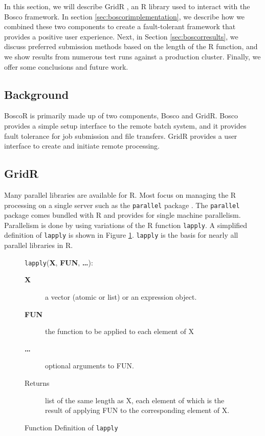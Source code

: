 In this section, we will describe GridR \cite{wegener2007gridr}, an R library used to interact with the Bosco framework.  In section \ref{sec:boscorimplementation}, we describe how we combined these two components to create a fault-tolerant framework that provides a positive user experience.  Next, in Section \ref{sec:boscorresults}, we discuss preferred submission methods based on the length of the R function, and we show results from numerous test runs against a production cluster.  Finally, we offer some conclusions and future work.

\subsection{Background}
BoscoR is primarily made up of two components, Bosco and GridR.  Bosco provides a simple setup interface to the remote batch system, and it provides fault tolerance for job submission and file transfers.  GridR provides a user interface to create and initiate remote processing.


\subsection{GridR}
Many parallel libraries are available for R.  Most focus on managing the R processing on a single server such as the \texttt{parallel} package \cite{rparallelpackage}.  The \texttt{parallel} package comes bundled with R and provides for single machine parallelism.  Parallelism is done by using variations of the R function \texttt{lapply}.  A simplified definition of \texttt{lapply} is shown in Figure \ref{lst:lapply}.  \texttt{lapply} is the basis for nearly all parallel libraries in R.  

\begin{figure}[h!t]
\begin{framed}
\texttt{lapply}(\textbf{X}, \textbf{FUN}, \textbf{\ldots}):
\begin{description}
\item[\textbf{X}] a vector (atomic or list) or an expression object.
\item[\textbf{FUN}] the function to be applied to each element of X
\item[\textbf{\ldots}] optional arguments to FUN.
\item[Returns] list of the same length as X, each element of which is the result of applying FUN to the corresponding element of X.
\end{description}
\end{framed}

\centering
\captionsetup{justification=centering}
\caption{Function Definition of \texttt{lapply}}
\label{lst:lapply}
\end{figure}


